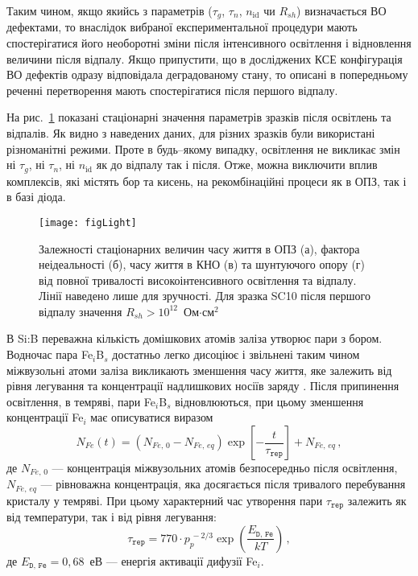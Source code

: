 Таким чином, якщо якийсь з параметрів ($\tau_g$, $\tau_n$, $n_{\mathrm{id}}$ чи $R_{sh}$) визначається ВО дефектами,
то внаслідок вибраної експериментальної процедури мають спостерігатися його необоротні зміни після інтенсивного освітлення і відновлення
величини після відпалу.
Якщо припустити, що в досліджених КСЕ конфігурація ВО дефектів одразу відповідала деградованому стану,
то описані в попередньому реченні перетворення мають спостерігатися після першого відпалу.

На рис.~\ref{figLight} показані стаціонарні значення параметрів зразків після освітлень та відпалів.
Як видно з наведених даних, для різних зразків були використані різноманітні режими.
Проте в будь--якому випадку, освітлення не викликає змін ні $\tau_g$, ні $\tau_n$, ні $n_{\mathrm{id}}$ як до
відпалу так і після.
Отже, можна виключити вплив комплексів, які містять бор та кисень, на рекомбінаційні процеси
як в ОПЗ, так і в базі діода.

\begin{figure}
\center
\texttt{[image: figLight]}
\caption{\label{figLight}
Залежності стаціонарних величин часу життя в ОПЗ (а),  фактора неідеальності (б), часу життя в КНО (в) та шунтуючого опору (г) від
повної тривалості високоінтенсивного освітлення та відпалу.
Лінії наведено лише для зручності.
Для зразка SC10 після першого відпалу значення $R_{sh}>10^{12}$~Ом$\cdot$см$^2$
}%
\end{figure}


В Si:B переважна кількість домішкових атомів заліза утворює пари з бором.
Водночас пара Fe$_i$B$_s$ достатньо легко дисоціює і звільнені таким чином міжвузольні атоми заліза
викликають зменшення часу життя, яке залежить від рівня легування та концентрації надлишкових носіїв заряду \cite{FeB:Schmidt}.
Після припинення освітлення, в темряві, пари Fe$_i$B$_s$ відновлюються, при цьому
зменшення концентрації Fe$_i$ має описуватися виразом \cite{MurphyJAP2011,Wijaranakula}
\begin{equation}
\label{eqFeB}
N_{Fe}(t)=(N_{Fe,\,0}-N_{Fe,\,eq})\exp\left[-\frac{t}{\tau_{\mathtt{rep}}}\right]+N_{Fe,\,eq}\,,
\end{equation}
де
$N_{Fe,\,0}$ --- концентрація міжвузольних атомів безпосередньо після освітлення,
$N_{Fe,\,eq}$ --- рівноважна концентрація, яка досягається після тривалого перебування кристалу у темряві.
При цьому характерний час утворення пари $\tau_{\mathtt{rep}}$ залежить як від температури, так і від
рівня легування:
\begin{equation}
\label{eqTrep}
\tau_{\mathtt{rep}}=770\cdot p_p^{\,-2/3}\exp\left(\frac{E_{\mathtt{D,\,Fe}}}{kT}\right)\,,
\end{equation}
де
$E_{\mathtt{D,\,Fe}}=0,68$~еВ --- енергія активації дифузії Fe$_i$.


